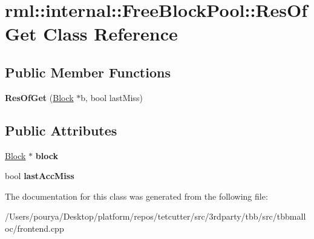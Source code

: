 \hypertarget{classrml_1_1internal_1_1FreeBlockPool_1_1ResOfGet}{}\section{rml\+:\+:internal\+:\+:Free\+Block\+Pool\+:\+:Res\+Of\+Get Class Reference}
\label{classrml_1_1internal_1_1FreeBlockPool_1_1ResOfGet}
\subsection*{Public Member Functions}
\begin{DoxyCompactItemize}
\item 
\hypertarget{classrml_1_1internal_1_1FreeBlockPool_1_1ResOfGet_a384e753602287d2db88b8d2ecfd30c0e}{}{\bfseries Res\+Of\+Get} (\hyperlink{classrml_1_1internal_1_1Block}{Block} $\ast$b, bool last\+Miss)\label{classrml_1_1internal_1_1FreeBlockPool_1_1ResOfGet_a384e753602287d2db88b8d2ecfd30c0e}

\end{DoxyCompactItemize}
\subsection*{Public Attributes}
\begin{DoxyCompactItemize}
\item 
\hypertarget{classrml_1_1internal_1_1FreeBlockPool_1_1ResOfGet_ac96452c87d5f9a987af40afbf216133e}{}\hyperlink{classrml_1_1internal_1_1Block}{Block} $\ast$ {\bfseries block}\label{classrml_1_1internal_1_1FreeBlockPool_1_1ResOfGet_ac96452c87d5f9a987af40afbf216133e}

\item 
\hypertarget{classrml_1_1internal_1_1FreeBlockPool_1_1ResOfGet_aa3699ac885699fdbb8952de8d20dc128}{}bool {\bfseries last\+Acc\+Miss}\label{classrml_1_1internal_1_1FreeBlockPool_1_1ResOfGet_aa3699ac885699fdbb8952de8d20dc128}

\end{DoxyCompactItemize}


The documentation for this class was generated from the following file\+:\begin{DoxyCompactItemize}
\item 
/\+Users/pourya/\+Desktop/platform/repos/tetcutter/src/3rdparty/tbb/src/tbbmalloc/frontend.\+cpp\end{DoxyCompactItemize}
